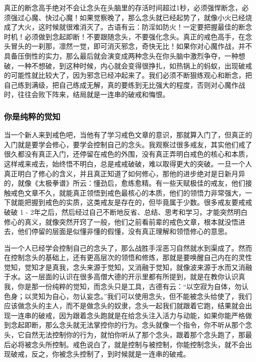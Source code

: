 真正的断念高手绝对不会让念头在头脑里的存活时间超过1秒，必须强悍断念，必须强过心魔、快过心魔！如果觉察晚了，那么念头就已经起势了，就像小火已经烧成了大火，这时候就很难消灭了。古语有云：防淫如防火！一定要把握最佳的断念时机！必须做到念起即断！不要跟随念头，不要强化念头。真正的戒色高手，在念头冒头的一刹那，凛然一觉，即可消灭邪念，奇快无比！如果你对心魔作战，并不具备压倒性的实力，那么最后就会演变成两种念头在你头脑中激烈争夺，一种想破，一种不想破，到这种时候，内心就会变得很挣扎，如热锅上的蚂蚁，出现破戒的可能性就比较大了，因为邪念已经冲起来了。我们必须不断狠练观心和断念，把自己练到满级，把自己练成无解，真的要练到无比强大的程度，否则对心魔作战时，往往会败下阵来，结局就是一连串的破戒和悔恨。

\subsubsection{你是纯粹的觉知}

当一个新人来到戒色吧，当他有了学习戒色文章的意识，那就算入门了，但真正的入门就是要学会修心，要学会控制自己的念头。我观察过很多戒友，其实他们戒了很久都没有真正入门，还停留在戒色的外围，没有真正弄明白戒色的核心和本质，这样戒来戒去，始终悟不明白，总是戒戒破破，难以取得更大的突破。一旦一个人真正明白了修心的含义，并且真正知道了如何修心，那他的进步绝对是日新月异的，就像《太极拳谱》所云：懂劲后，愈练愈精。有一些天赋极佳的戒友，他们接触戒色文章不久，就能真正领悟到戒色最核心的本质，他们的领悟力非常强大，一下就能把握到戒色的实质，这类戒友是存在的，但毕竟属于少数。很多戒友要戒戒破破 1 - 2年之后，然后经过自己不断地反省、总结、思考和学习，才能突然明白修心的真义，就像突然开窍了一般，他们之前看前辈的戒色文章，根本就没悟进去，他们停留的层面是似懂非懂的假懂，没有真正理解和领悟修心的意思。

当一个人已经学会控制自己的念头了，那么战胜手淫恶习自然就水到渠成了。然而在控制念头的基础上，还有更高层次的领悟和修炼，那就是要唤醒自己内在的灵性觉知，觉知才是真我，念头来源于觉知，又消融于觉知，就像波来源于水而又消融于水。这一层面的认识在很多高僧大德的开示里都有所提到，就是在教你认识真我，你是那一份纯粹的觉知，而念头只是工具，古德有云：“以空寂为自体，勿认色身；以灵知为自心，勿认妄念。”我们可以使用念头，但不能被念头给使了，我们应该做念头的主人，而不是做念头的奴隶，念头一起我们就跟着它跑，结果就会出现一连串的破戒，因为跟着念头跑就是在给念头注入活力与动能，如果你能严格做到念起即断，那么念头就无法掌控你的行为。念头就像一个指令，你不听从那个念头，它自然无法控制你的行为，就怕你听从了那个念头，跟着那个念头跑了，那最后必将被念头所控制。戒色说白了，就是控制与被控制，你能控制念头，就不会出现破戒，反之，你被念头控制了，到时候就是一连串的破戒。

